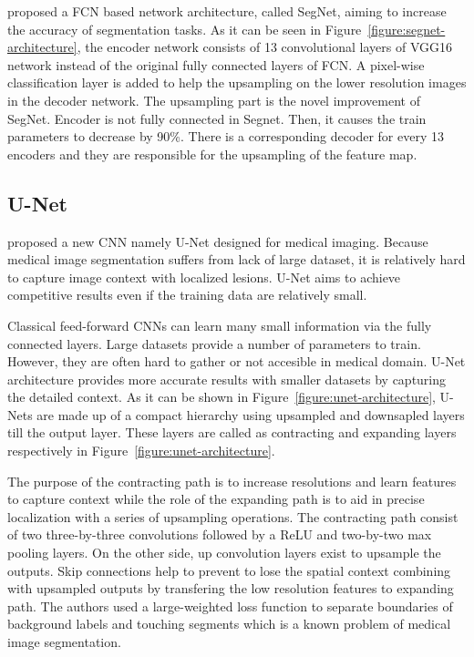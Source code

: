         \citet{badrinarayanan2017segnet} proposed a FCN based network architecture, called SegNet, aiming to increase the accuracy of segmentation tasks.
        As it can be seen in Figure~\ref{figure:segnet-architecture}, the encoder network consists of 13 convolutional layers of VGG16 network
        instead of the original fully connected layers of FCN. A pixel-wise classification layer is added to help the upsampling on the lower resolution images in the decoder network.
        The upsampling part is the novel improvement of SegNet. Encoder is not fully connected in Segnet. Then, it causes the train parameters to decrease by 90\%.
        There is a corresponding decoder for every 13 encoders and they are responsible for the upsampling of the feature map.

        

    \subsection{U-Net}\label{section:unet}

        \citet{ronneberger2015u} proposed a new CNN namely U-Net designed for medical imaging.
        Because medical image segmentation suffers from lack of large dataset, it is relatively hard to capture image context with localized lesions.
        U-Net aims to achieve competitive results even if the training data are relatively small.

        

        Classical feed-forward CNNs can learn many small information via the fully connected layers.
        Large datasets provide a number of parameters to train.
        However, they are often hard to gather or not accesible in medical domain.
        U-Net architecture provides more accurate results with smaller datasets by capturing
        the detailed context. As it can be shown in Figure~\ref{figure:unet-architecture}, U-Nets are made up of a compact hierarchy using upsampled and downsapled layers till the output layer.
        These layers are called as contracting and expanding layers respectively in Figure~\ref{figure:unet-architecture}.

        The purpose of the contracting path is to increase resolutions and learn features  to capture context while the role of the expanding path is to aid in precise localization with a series of upsampling operations.
        The contracting path consist of two three-by-three convolutions followed by a ReLU and two-by-two max pooling layers.
        On the other side, up convolution layers exist to upsample the outputs.
        Skip connections help to prevent to lose the spatial context combining with upsampled outputs by transfering the low resolution features to expanding path.
        The authors used a large-weighted loss function to separate boundaries of background labels and touching segments which is a known problem of medical image segmentation.

